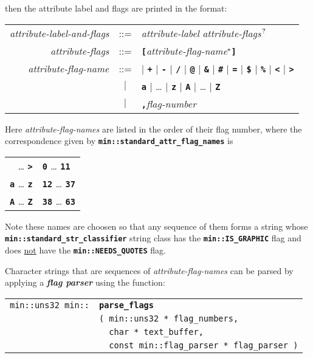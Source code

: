 \documentclass[12pt]{article}
\makeatletter
\newcommand{\TT}[1]{{\tt \bfseries #1}}
\newcommand{\QMARK}{{$^{\,\mbox{\footnotesize ?}}$}}
\newcommand{\key}[1]{{\bf \em #1}\index{#1}}
\newcommand{\ttindex}[1]{\index{#1@{\tt #1}}}
\newcommand{\EOL}{\penalty \exhyphenpenalty}
\newenvironment{indpar}[1][0.3in]%
	{\begin{list}{}%
		     {\setlength{\itemsep}{0in}%
		      \setlength{\topsep}{0in}%
		      \setlength{\parsep}{1ex}%
		      \setlength{\labelwidth}{#1}%
		      \setlength{\leftmargin}{#1}%
		      \addtolength{\leftmargin}{\labelsep}}%
	 \item}%
	{\end{list}}
\newcommand{\LABEL}[1]{\label{#1}}
\newlength{\ARGBREAKLENGTH}
\newcommand{\ARGBREAK}[1][\ARGBREAKLENGTH]{\\&\hspace*{#1}}
\newcommand{\MINKEY}[1]%
	   {\TT{#1}\ttindex{min::#1}\ttindex{#1}}
\makeatother
\begin{document}
then the attribute label and flags are printed in the format:

\newcommand{\TTBS}[1]{\TT{\textbackslash#1}}
\begin{center}
\begin{tabular}{rcl}
{\em attribute-label-and-flags} & ::= & {\em attribute-label}
                                        {\em attribute-flags}\QMARK{} \\
{\em attribute-flags}
    & ::= & \TT{[}{\em attribute-flag-name}$^\star$\TT{]} \\
{\em attribute-flag-name} & ::= &
        \TT{*} $|$ \TT{+} $|$ \TT{-} $|$ \TT{/} $|$ \TT{@}
    $|$ \TT{\&} $|$ \TT{\#} $|$ \TT{=} $|$ \TT{\$}
    $|$ \TT{\%} $|$ \TT{<} $|$ \TT{>} \\
& $|$ & \TT{a} $|$ \ldots{} $|$ \TT{z} $|$ \TT{A} $|$ \ldots{} $|$ \TT{Z} \\
& $|$ & \TT{,}{\em flag-number}
\end{tabular}
\end{center}

Here {\em attribute-flag-names} are listed in the order of their flag number,
where the correspondence given
by \TT{min::\EOL standard\_\EOL attr\_\EOL flag\_\EOL names} is
\begin{center}
\begin{tabular}{r@{~correspond to flag numbers~}l}
\TT{*} \ldots{} \TT{>} & \TT{0} \ldots{} \TT{11} \\
\TT{a} \ldots{} \TT{z} & \TT{12} \ldots{} \TT{37} \\
\TT{A} \ldots{} \TT{Z} & \TT{38} \ldots{} \TT{63} \\
\end{tabular}
\end{center}

Note these names are choosen so that any sequence of them forms
a string whose \TT{min::stan\-dard\_\EOL str\_\EOL classifier} string
class has the \TT{min::\EOL IS\_\EOL GRAPHIC} flag and does
\underline{not} have the \TT{min::\EOL NEEDS\_\EOL QUOTES} flag.

Character strings that are sequences of {\em attribute-flag-names}
can be parsed by applying a \key{flag parser} using the function:

\begin{indpar}[1em]\begin{tabular}{r@{}l}
\verb|min::uns32 min::| & \MINKEY{parse\_flags}\ARGBREAK
    \verb|( min::uns32 * flag_numbers,|\ARGBREAK
    \verb|  char * text_buffer,|\ARGBREAK
    \verb|  const min::flag_parser * flag_parser )|
\LABEL{MIN::PARSE_FLAGS} \\
\end{tabular}\end{indpar}
\end{document}
